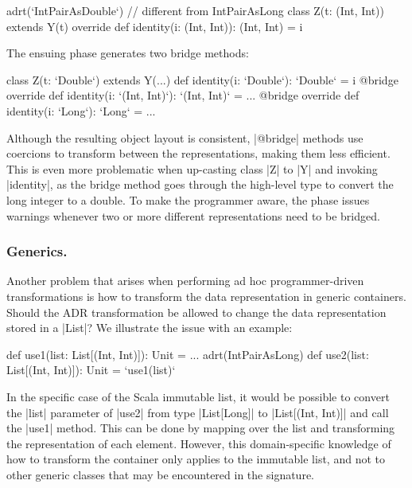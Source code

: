 \begin{lstlisting-nobreak}
adrt(`IntPairAsDouble`) { // different from IntPairAsLong
  class Z(t: (Int, Int)) extends Y(t) {
    override def identity(i: (Int, Int)): (Int, Int) = i
  }
}
\end{lstlisting-nobreak}

The ensuing \bridge{} phase generates two bridge methods: %

\begin{lstlisting-nobreak}
class Z(t: `Double`) extends Y(...) {
  def identity(i: `Double`): `Double` = i
  @bridge override def identity(i: `(Int, Int)`): `(Int, Int)` = ...
  @bridge override def identity(i: `Long`): `Long` = ...
}
\end{lstlisting-nobreak}


Although the resulting object layout is consistent, |@bridge| methods use coercions to transform between the representations, making them less efficient. This is even more problematic when up-casting class |Z| to |Y| and invoking |identity|, as the bridge method goes through the high-level type to convert the long integer to a double. To make the programmer aware, the \bridge{} phase issues warnings whenever two or more different representations need to be bridged.

\subsubsection{Generics.}
Another problem that arises when performing ad hoc programmer-driven transformations is how to transform the data representation in generic containers. Should the ADR transformation be allowed to change the data representation stored in a |List|? We illustrate the issue with an example:

\begin{lstlisting-nobreak}
def use1(list: List[(Int, Int)]): Unit = ...
adrt(IntPairAsLong) {
  def use2(list: List[(Int, Int)]): Unit = `use1(list)`
}
\end{lstlisting-nobreak}

In the specific case of the Scala immutable list, it would be possible to convert the |list| parameter of |use2| from type |List[Long]| to |List[(Int, Int)]| and call the |use1| method. This can be done by mapping over the list and transforming the representation of each element. However, this domain-specific knowledge of how to transform the container only applies to the immutable list, and not to other generic classes that may be encountered in the signature.

